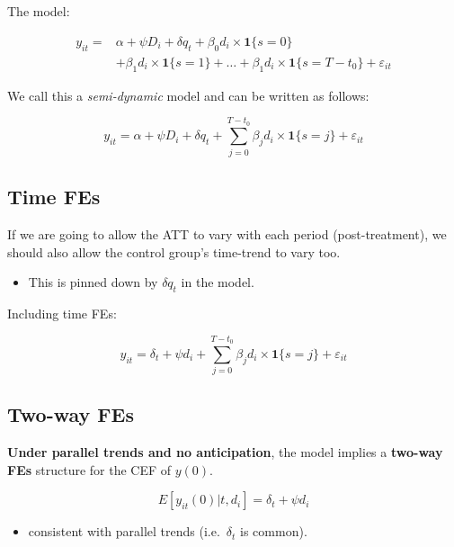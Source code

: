 \documentclass[
  letterpaper,
  DIV=11,
  numbers=noendperiod]{scrartcl}
\providecommand{\tightlist}{%
  \setlength{\itemsep}{0pt}\setlength{\parskip}{0pt}}
\begin{document}
\subsection{}\label{section-14}

The model:

\[
  \begin{aligned}
  y_{it} =& \alpha + \psi D_i + \delta q_t +\beta_0 d_i\times\mathbf{1}\{s=0\} \\
  &+ \beta_1d_i\times\mathbf{1}\{s=1\} + \dots + \beta_1d_i\times\mathbf{1}\{s=T-t_0\} + \varepsilon_{it}
  \end{aligned}
\]

\hfill\break

We call this a \emph{semi-dynamic} model and can be written as follows:

\[
  y_{it} = \alpha + \psi D_i + \delta q_t + \sum_{j=0}^{T-t_0}\beta_jd_i\times\mathbf{1}\{s=j\} + \varepsilon_{it}
\]

\subsection{Time FEs}\label{time-fes}

If we are going to allow the ATT to vary with each period
(post-treatment), we should also allow the control group's time-trend to
vary too.

\begin{itemize}
\tightlist
\item
  This is pinned down by \(\delta q_t\) in the model.
\end{itemize}

\hfill\break

Including time FEs:

\[
  y_{it} = \delta_t + \psi d_i + \sum_{j=0}^{T-t_0}\beta_jd_i\times\mathbf{1}\{s=j\} + \varepsilon_{it}
\]

\subsection{Two-way FEs}\label{two-way-fes}

\textbf{Under parallel trends and no anticipation}, the model implies a
\textbf{two-way FEs} structure for the CEF of \(y(0)\).

\[
  E[y_{it}(0)|t,d_i] =  \delta_t + \psi d_i
\]

\begin{itemize}
\tightlist
\item
  consistent with parallel trends (i.e.~\(\delta_t\) is common).
\end{itemize}
\end{document}
